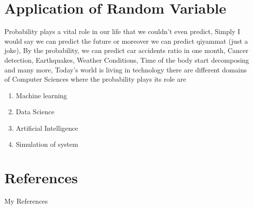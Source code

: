 \documentclass[12pt]{article}
\begin{document}
\clearpage
\section{Application of Random Variable}
Probability plays a vital role in our life that we couldn’t even predict, Simply I would say we can predict the future or moreover  we can predict qiyammat (just a  joke), By the probability, we can predict car accidents ratio in one month, Cancer detection, Earthquakes, Weather Conditions, Time of the body start decomposing and many more, Today’s world is living in technology there are different domains of Computer Sciences where the probability plays its role are
\begin{enumerate}
    \item 
    Machine learning
     \item 
    Data Science
     \item 
     Artificial Intelligence
      \item 
     Simulation of system 
\end{enumerate}

  

\clearpage
\section{References}
My References 
\cite{lu2017structural}
\cite{tong2021normal}
\cite{zhao2018complete}
\cite{zhao2020monotonic}
\cite{zhao2021orthogonal}
\cite{chambers1976method}


\end{document}
